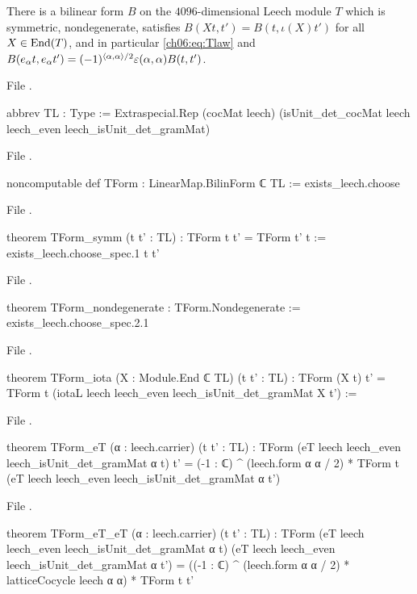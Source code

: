 \begin{theorem}\label{ch06:thm:TForm}
There is a bilinear form $B$ on the $4096$-dimensional Leech module $T$ which is symmetric,
nondegenerate, satisfies $B(Xt,t')=B(t,\iota(X)t')$ for all $X\in\operatorname{End}(T)$, and in particular
\eqref{ch06:eq:Tlaw} and $B(e_\alpha t,e_\alpha t')=(-1)^{\langle\alpha,\alpha\rangle/2}
\varepsilon(\alpha,\alpha)B(t,t')$.
\end{theorem}
\noindent File .
\begin{leancode}
abbrev TL : Type :=
  Extraspecial.Rep (cocMat leech) (isUnit_det_cocMat leech leech_even leech_isUnit_det_gramMat)
\end{leancode}
\noindent File .
\begin{leancode}
noncomputable def TForm : LinearMap.BilinForm ℂ TL := exists_leech.choose
\end{leancode}
\noindent File .
\begin{leancode}
theorem TForm_symm (t t' : TL) : TForm t t' = TForm t' t := exists_leech.choose_spec.1 t t'
\end{leancode}
\noindent File .
\begin{leancode}
theorem TForm_nondegenerate : TForm.Nondegenerate := exists_leech.choose_spec.2.1
\end{leancode}
\noindent File .
\begin{leancode}
theorem TForm_iota (X : Module.End ℂ TL) (t t' : TL) :
    TForm (X t) t' = TForm t (iotaL leech leech_even leech_isUnit_det_gramMat X t') :=
\end{leancode}
\noindent File .
\begin{leancode}
theorem TForm_eT (α : leech.carrier) (t t' : TL) :
    TForm (eT leech leech_even leech_isUnit_det_gramMat α t) t'
      = (-1 : ℂ) ^ (leech.form α α / 2) *
        TForm t (eT leech leech_even leech_isUnit_det_gramMat α t')
\end{leancode}
\noindent File .
\begin{leancode}
theorem TForm_eT_eT (α : leech.carrier) (t t' : TL) :
    TForm (eT leech leech_even leech_isUnit_det_gramMat α t)
        (eT leech leech_even leech_isUnit_det_gramMat α t')
      = ((-1 : ℂ) ^ (leech.form α α / 2) * latticeCocycle leech α α) * TForm t t'
\end{leancode}
